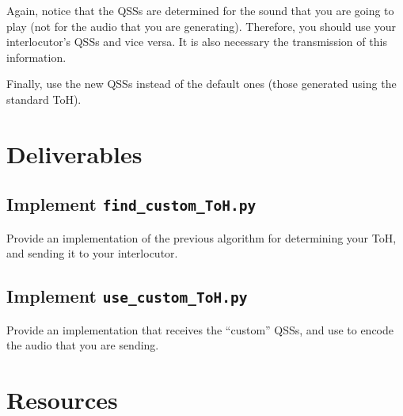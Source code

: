 Again, notice that the QSSs are determined for the sound that you are
going to play (not for the audio that you are generating). Therefore,
you should use your interlocutor's QSSs and vice versa. It is also
necessary the transmission of this information.

Finally, use the new QSSs instead of the default ones (those generated
using the standard ToH).

\section{Deliverables}

\subsection{Implement \texttt{find\_custom\_ToH.py}}

Provide an implementation of the previous algorithm for determining
your ToH, and sending it to your interlocutor.

\subsection{Implement \texttt{use\_custom\_ToH.py}}

Provide an implementation that receives the ``custom'' QSSs, and use to
encode the audio that you are sending.

\section{Resources}



